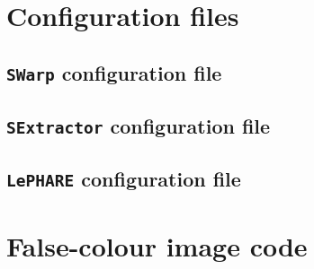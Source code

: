 \chapter{Configuration files}


\section{\texttt{SWarp} configuration file}\label{appendix:swarp}



\section{\texttt{SExtractor} configuration file}\label{appendix:sextractor}




\section{\texttt{LePHARE} configuration file}\label{appendix:config_lephare}


\chapter{False-colour image code}\label{appendix:false_colour}
